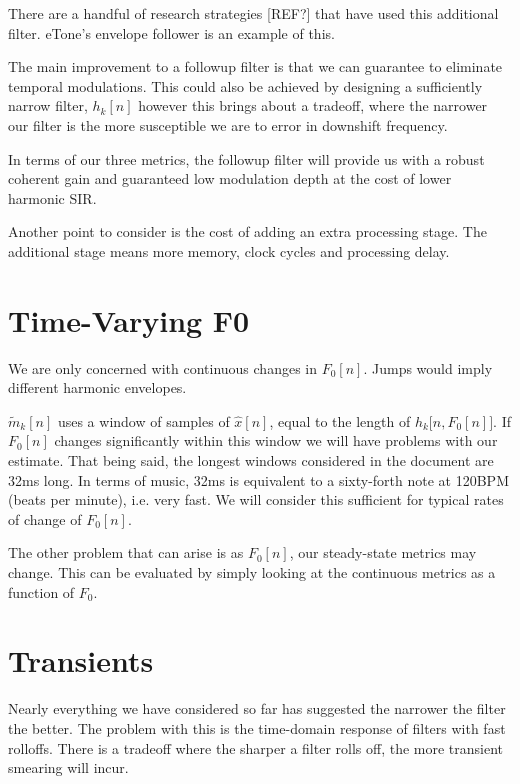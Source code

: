 \documentclass [11pt, proquest,oneside] {uwthesis}[2015/03/03]
\begin{document}
There are a handful of research strategies [REF?] that have used this additional filter.  eTone's envelope follower is an example of this.

The main improvement to a followup filter is that we can guarantee to eliminate temporal modulations.  This could also be achieved by designing a sufficiently narrow filter, $h_k[n]$ however this brings about a tradeoff, where the narrower our filter is the more susceptible we are to error in downshift frequency.

In terms of our three metrics, the followup filter will provide us with a robust coherent gain and guaranteed low modulation depth at the cost of lower harmonic SIR.

Another point to consider is the cost of adding an extra processing stage.  The additional stage means more memory, clock cycles and processing delay.


\section{Time-Varying F0}

We are only concerned with continuous changes in $F_0[n]$.  Jumps would imply different harmonic envelopes.

$\tilde{m}_k[n]$ uses a window of samples of $\widehat{x}[n]$, equal to the length of $h_k\big[n,F_0[n]\big]$.  If $F_0[n]$ changes significantly within this window we will have problems with our estimate.  That being said, the longest windows considered in the document are 32ms long.  In terms of music, 32ms is equivalent to a sixty-forth note at 120BPM (beats per minute), i.e. very fast.  We will consider this sufficient for typical rates of change of $F_0[n]$.

The other problem that can arise is as $F_0[n]$, our steady-state metrics may change.  This can be evaluated by simply looking at the continuous metrics as a function of $F_0$.

\section{Transients}\label{section:transients}

Nearly everything we have considered so far has suggested the narrower the filter the better.  The problem with this is the time-domain response of filters with fast rolloffs.  There is a tradeoff where the sharper a filter rolls off, the more transient smearing will incur.
\end{document}
